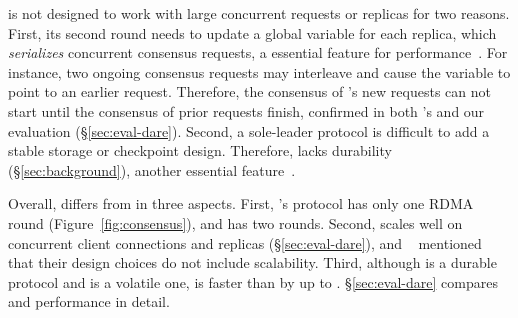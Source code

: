

\dare is not designed to work with large concurrent requests or 
replicas for two reasons. First, its second round needs to update a global 
variable for each replica, which \emph{serializes} concurrent consensus 
requests, a essential feature for \paxos performance~\cite{paxos:practical}. 
For instance, two ongoing \dare consensus requests may interleave and cause the 
variable to point to an earlier request. Therefore, the consensus of \dare's 
new requests can not start until the consensus of prior requests finish, 
confirmed in both \dare's and our evaluation (\S\ref{sec:eval-dare}). Second, a 
sole-leader protocol is difficult to add a stable storage or 
checkpoint design. Therefore, \dare lacks durability 
(\S\ref{sec:background}), another essential \paxos 
feature~\cite{lyu1995software}.



Overall, \xxx differs from \dare in three aspects. First, \xxx's protocol has 
only one RDMA round (Figure~\ref{fig:consensus}), and \dare has two rounds. 
Second, \xxx scales well on concurrent client connections and replicas 
(\S\ref{sec:eval-dare}), and \dare~\cite{dare:hpdc15} mentioned that their 
design choices do not include scalability. Third, although \xxx is a durable 
protocol and \dare is a volatile one, \xxx is faster than \dare by up to 
\fasterDARE. \S\ref{sec:eval-dare} compares \xxx and \dare performance in 
detail.

